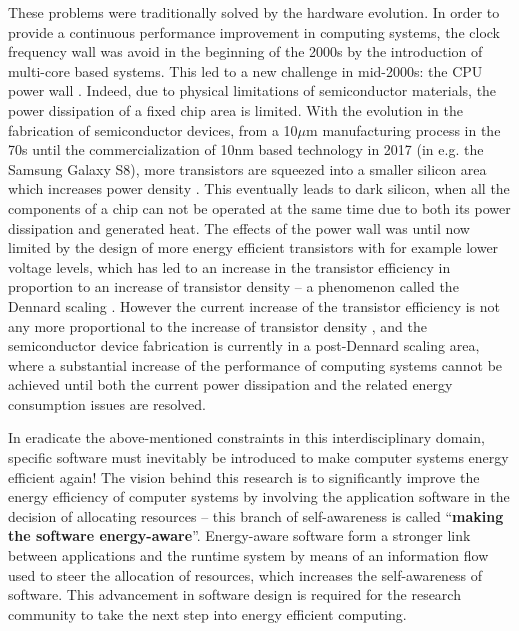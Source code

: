 \documentclass{article}
\begin{document}
These problems were traditionally solved by the hardware evolution.
In order to provide a continuous performance improvement in computing systems, the clock frequency wall was avoid in the beginning of the 2000s by the introduction of multi-core based systems. 
This led to a new challenge in mid-2000s: the CPU power wall \cite{Danowitz:12,Wang:13}. 
Indeed, due to physical limitations of semiconductor materials, the power dissipation of a fixed chip area is limited. 
With the evolution in the fabrication of semiconductor devices, from a 10$\mu$m manufacturing process in the 70s until the commercialization of 10nm based technology in 2017 (in e.g. the Samsung Galaxy S8), more transistors are squeezed into a smaller silicon area which increases power density \cite{5514312}. 
This eventually leads to dark silicon, when all the components of a chip can not be operated at the same time due to both its power dissipation and generated heat. 
The effects of the power wall was until now limited by the design of more energy efficient transistors with for example lower voltage levels,
which has led to an increase in the transistor efficiency in proportion to an increase of transistor density -- a phenomenon called the Dennard scaling \cite{Dennard:74}. 
However the current increase of the transistor efficiency is not any more proportional to the increase of transistor density \cite{Wang:13}, 
and the semiconductor device fabrication is currently in a post-Dennard scaling area, where a substantial increase of the performance of computing
systems cannot be achieved until both the current power dissipation and the related energy consumption issues are resolved.\smallskip

In eradicate the above-mentioned constraints in this interdisciplinary domain, specific software must inevitably be introduced to make computer systems energy efficient again!
The vision behind this research is to significantly improve the energy efficiency of computer systems by involving the application software in the decision of allocating resources -- this branch of self-awareness is called ``\textbf{making the software energy-aware}''.
Energy-aware software form a stronger link between applications and the runtime system by means of an information flow used to steer the allocation of resources,
which increases the self-awareness of software. This advancement in software design is required for the research community to take the next step into energy efficient computing.\smallskip
\end{document}
